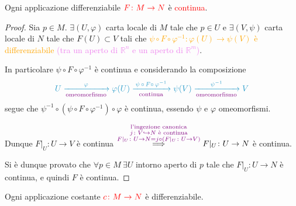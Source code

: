         \begin{proposizione}
        \label{prop:applicazione_differenziabile_tra_varieta_continua}
        \mbox{}

        Ogni applicazione differenziabile $\textcolor{red}{F \colon M \to N}$ è \textcolor{red}{continua}.
        \end{proposizione}

        \begin{proof}
        \mbox{}

        Sia $p \in M$. $\exists (U, \varphi)$ carta locale di $M$ tale che $p \in U$ e $\exists (V, \psi)$ carta locale di $N$ tale che $F(U) \subset V$ tali
         che \textcolor{orange}{$\psi \circ F \circ \varphi^{-1} \colon \varphi(U) \to \psi(V)$ è differenziabile} \textcolor{violet}{(tra un aperto di $\mathbb{R}^n$ e un aperto di $\mathbb{R}^m$)}. 
        
        In particolare $\psi \circ F \circ \varphi^{-1}$ è continua e considerando la composizione 
        \[
       \color{celeste} U \xrightarrow[\textcolor{violet}{\text{omeomorfismo}}]{\varphi} \varphi(U) \xrightarrow[\textcolor{violet}{\text{continua}}]{\, \psi \, \circ \, F \circ \, \varphi^{-1} \,} \psi(V) \xrightarrow[\textcolor{violet}{\text{omeomorfismo}}]{\psi^{-1}} V
        \]
        segue che $\psi^{-1} \circ (\psi \circ F \circ \varphi^{-1}) \circ \varphi$ è continua, essendo $\psi$ e $\varphi$ omeomorfismi. 
        
        Dunque $F|_U \colon U \to V$ è continua $\overset{\textcolor{violet}{\substack{\text{l'ingezione canonica} \\j \colon V \hookrightarrow N \text{ è continua} \\
        F|_U \colon U \to N = j \circ (F|_U \colon U \to V) }}}{\Longrightarrow} F|_U \colon U \to N$ è continua.
        
        Si è dunque provato che $\forall p \in M \ \exists U$ intorno aperto di $p$ tale che $F|_U \colon U \to N$ è continua, e quindi $F$ è continua.
        \end{proof}

        \begin{proposizione}
        \mbox{}

        Ogni applicazione costante $\textcolor{red}{c \colon M \to N}$ è differenziabile.
        \end{proposizione}

